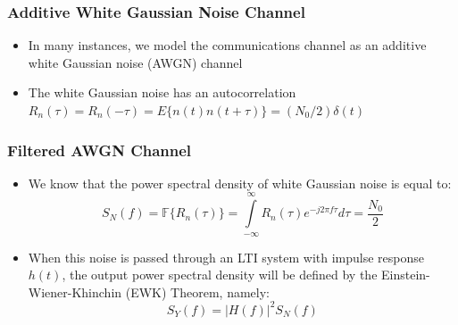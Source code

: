 \documentclass[10pt]{beamer}
\begin{document}
\frame
{
  \frametitle{Additive White Gaussian Noise Channel}

  \begin{itemize}
    \item In many instances, we model the communications channel as an additive white Gaussian noise (AWGN) channel
    \item The white Gaussian noise has an autocorrelation $R_n(\tau)=R_n(-\tau)=E\{n(t)n(t+\tau)\}=(N_0/2)\delta(t)$
  \end{itemize}

}
\frame
{
  \frametitle{Filtered AWGN Channel}

  \begin{itemize}
    \item We know that the power spectral density of white Gaussian noise is equal to:
    \begin{equation}
        S_N(f)=\mathbb{F}\{R_n(\tau)\}=\int\limits_{-\infty}^{\infty}R_n(\tau)e^{-j2\pi{f}\tau}d\tau=\frac{N_0}{2}
    \end{equation}
    \item When this noise is passed through an LTI system with impulse response $h(t)$, the output power spectral density will be defined by the Einstein-Wiener-Khinchin (EWK) Theorem, namely:
    \begin{equation}
        S_Y(f)=|H(f)|^2S_N(f)
    \end{equation}
  \end{itemize}

}
\end{document}
